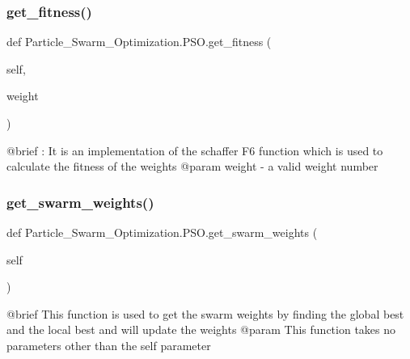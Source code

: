 \subsubsection{\texorpdfstring{get\+\_\+fitness()}{get\_fitness()}}
{\footnotesize\ttfamily def Particle\+\_\+\+Swarm\+\_\+\+Optimization.\+P\+S\+O.\+get\+\_\+fitness (\begin{DoxyParamCaption}\item[{}]{self,  }\item[{}]{weight }\end{DoxyParamCaption})}

\begin{DoxyVerb}@brief : It is an implementation of the schaffer F6 function which is used to calculate the fitness of the weights
@param weight - a valid weight number\end{DoxyVerb}
 \hypertarget{class_particle___swarm___optimization_1_1_p_s_o_aba0d1ce14ce74445ee798358d5475559}{}\label{class_particle___swarm___optimization_1_1_p_s_o_aba0d1ce14ce74445ee798358d5475559} 
\subsubsection{\texorpdfstring{get\+\_\+swarm\+\_\+weights()}{get\_swarm\_weights()}}
{\footnotesize\ttfamily def Particle\+\_\+\+Swarm\+\_\+\+Optimization.\+P\+S\+O.\+get\+\_\+swarm\+\_\+weights (\begin{DoxyParamCaption}\item[{}]{self }\end{DoxyParamCaption})}

\begin{DoxyVerb}@brief   This function is used to get the swarm weights by finding the
     global best and the local best and will update the weights
@param  This function takes no parameters other than the self parameter\end{DoxyVerb}
 \hypertarget{class_particle___swarm___optimization_1_1_p_s_o_abf63d69aa42e75058a939c6dac4416c5}{}\label{class_particle___swarm___optimization_1_1_p_s_o_abf63d69aa42e75058a939c6dac4416c5} 
